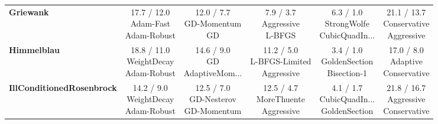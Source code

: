 \begin{longtable}{lccccc}
\textbf{Griewank} &  \makecell{17.7 / 12.0 \\ \scriptsize{Adam-Fast} \\ \scriptsize{Adam-Robust}}&  \makecell{12.0 / 7.7 \\ \scriptsize{GD-Momentum} \\ \scriptsize{GD}}&  \makecell{7.9 / 3.7 \\ \scriptsize{Aggressive} \\ \scriptsize{L-BFGS}}& \cellcolor{bestgreen!30} \makecell{6.3 / 1.0 \\ \scriptsize{StrongWolfe} \\ \scriptsize{CubicQuadIn...}}& \cellcolor{worstred!20} \makecell{21.1 / 13.7 \\ \scriptsize{Conservative} \\ \scriptsize{Aggressive}} \\
\textbf{Himmelblau} & \cellcolor{worstred!20} \makecell{18.8 / 11.0 \\ \scriptsize{WeightDecay} \\ \scriptsize{Adam-Robust}}&  \makecell{14.6 / 9.0 \\ \scriptsize{GD} \\ \scriptsize{AdaptiveMom...}}&  \makecell{11.2 / 5.0 \\ \scriptsize{L-BFGS-Limited} \\ \scriptsize{Aggressive}}& \cellcolor{bestgreen!30} \makecell{3.4 / 1.0 \\ \scriptsize{GoldenSection} \\ \scriptsize{Bisection-1}}&  \makecell{17.0 / 8.0 \\ \scriptsize{Adaptive} \\ \scriptsize{Conservative}} \\
\textbf{IllConditionedRosenbrock} &  \makecell{14.2 / 9.0 \\ \scriptsize{WeightDecay} \\ \scriptsize{Adam-Robust}}&  \makecell{12.5 / 7.0 \\ \scriptsize{GD-Nesterov} \\ \scriptsize{GD-Momentum}}&  \makecell{12.5 / 4.7 \\ \scriptsize{MoreThuente} \\ \scriptsize{Aggressive}}& \cellcolor{bestgreen!30} \makecell{4.1 / 1.7 \\ \scriptsize{CubicQuadIn...} \\ \scriptsize{GoldenSection}}& \cellcolor{worstred!20} \makecell{21.8 / 16.7 \\ \scriptsize{Aggressive} \\ \scriptsize{Conservative}} \\

\end{longtable}
